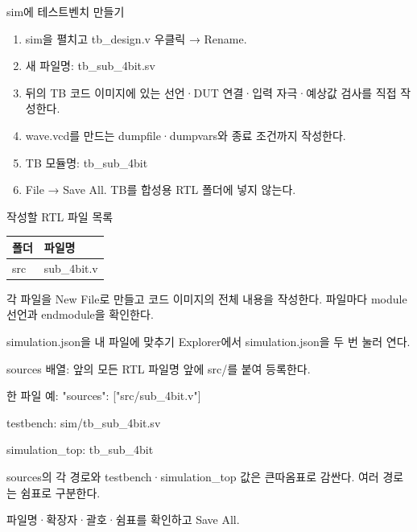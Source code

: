 \begin{frame}{sim에 테스트벤치 만들기}\relax
\small
\begin{enumerate}\setlength{\itemsep}{0.22cm}
\item sim을 펼치고 tb\_design.v 우클릭 → Rename.
\item 새 파일명: tb\_sub\_4bit.sv
\item 뒤의 TB 코드 이미지에 있는 선언·DUT 연결·입력 자극·예상값 검사를 직접 작성한다.
\item wave.vcd를 만드는 dumpfile·dumpvars와 종료 조건까지 작성한다.
\item TB 모듈명: tb\_sub\_4bit
\item File → Save All. TB를 합성용 RTL 폴더에 넣지 않는다.
\end{enumerate}

\end{frame}

\begin{frame}{작성할 RTL 파일 목록}\relax
\small
\begin{center}\renewcommand{\arraystretch}{1.45}
\begin{tabular}{l|l}
폴더 & 파일명\\\hline
src & sub\_4bit.v\\
\end{tabular}\end{center}
각 파일을 New File로 만들고 코드 이미지의 전체 내용을 작성한다. 파일마다 module 선언과 endmodule을 확인한다.\par
\end{frame}

\begin{frame}{simulation.json을 내 파일에 맞추기}\relax
\small
Explorer에서 simulation.json을 두 번 눌러 연다.\par\vspace{0.22cm}sources 배열: 앞의 모든 RTL 파일명 앞에 src/를 붙여 등록한다.\par\vspace{0.22cm}한 파일 예: "sources": ["src/sub\_4bit.v"]\par\vspace{0.22cm}testbench: sim/tb\_sub\_4bit.sv\par\vspace{0.22cm}simulation\_top: tb\_sub\_4bit\par\vspace{0.22cm}sources의 각 경로와 testbench·simulation\_top 값은 큰따옴표로 감싼다. 여러 경로는 쉼표로 구분한다.\par\vspace{0.22cm}파일명·확장자·괄호·쉼표를 확인하고 Save All.\par
\end{frame}


